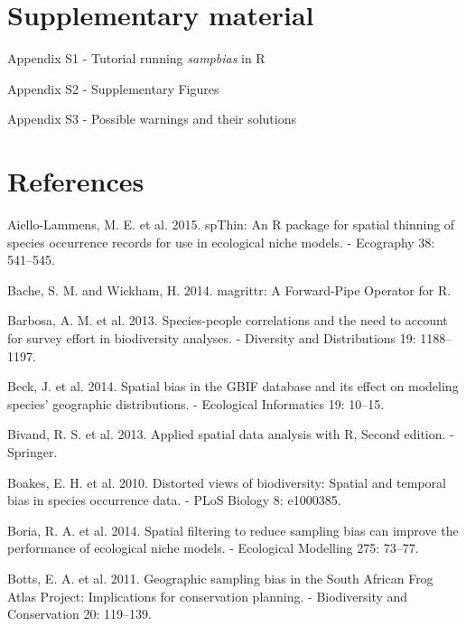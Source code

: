 \documentclass[
  12pt,
]{article}
\begin{document}
\newpage{}

\hypertarget{supplementary-material}{%
\section{Supplementary material}\label{supplementary-material}}

Appendix S1 - Tutorial running \emph{sampbias} in R

Appendix S2 - Supplementary Figures

Appendix S3 - Possible warnings and their solutions

\newpage{}

\hypertarget{references}{%
\section*{References}\label{references}}

\hypertarget{refs}{}
\leavevmode\hypertarget{ref-Aiello-Lammens2015}{}%
Aiello-Lammens, M. E. et al. 2015. spThin: An R package for spatial thinning of species occurrence records for use in ecological niche models. - Ecography 38: 541--545.

\leavevmode\hypertarget{ref-Bache2014}{}%
Bache, S. M. and Wickham, H. 2014. magrittr: A Forward-Pipe Operator for R.

\leavevmode\hypertarget{ref-Barbosa2013}{}%
Barbosa, A. M. et al. 2013. Species-people correlations and the need to account for survey effort in biodiversity analyses. - Diversity and Distributions 19: 1188--1197.

\leavevmode\hypertarget{ref-Beck2014}{}%
Beck, J. et al. 2014. Spatial bias in the GBIF database and its effect on modeling species' geographic distributions. - Ecological Informatics 19: 10--15.

\leavevmode\hypertarget{ref-Bivand2013}{}%
Bivand, R. S. et al. 2013. Applied spatial data analysis with R, Second edition. - Springer.

\leavevmode\hypertarget{ref-Boakes2010}{}%
Boakes, E. H. et al. 2010. Distorted views of biodiversity: Spatial and temporal bias in species occurrence data. - PLoS Biology 8: e1000385.

\leavevmode\hypertarget{ref-Boria2014}{}%
Boria, R. A. et al. 2014. Spatial filtering to reduce sampling bias can improve the performance of ecological niche models. - Ecological Modelling 275: 73--77.

\leavevmode\hypertarget{ref-Botts2011}{}%
Botts, E. A. et al. 2011. Geographic sampling bias in the South African Frog Atlas Project: Implications for conservation planning. - Biodiversity and Conservation 20: 119--139.
\end{document}
